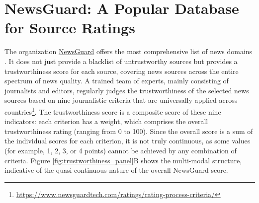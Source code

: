 \documentclass{article}
\begin{document}
\section{NewsGuard: A Popular Database for Source Ratings}
The organization \href{https://www.newsguardtech.com/}{NewsGuard} offers the most comprehensive list of news domains \citep{linHighLevelCorrespondence2023a}. 
It does not just provide a blacklist of untrustworthy sources but provides a trustworthiness score for each source, covering news sources across the entire spectrum of news quality. 
A trained team of experts, mainly consisting of journalists and editors, regularly judges the trustworthiness of the selected news sources based on nine journalistic criteria that are universally applied across countries\footnote{\href{https://web.archive.org/web/20240131155450/https://www.newsguardtech.com/ratings/rating-process-criteria/}{https://www.newsguardtech.com/ratings/rating-process-criteria/}}.
The trustworthiness score is a composite score of these nine indicators: each criterion has a weight, which comprises the overall trustworthiness rating (ranging from 0 to 100). 
Since the overall score is a sum of the individual scores for each criterion, it is not truly continuous, as some values (for example, 1, 2, 3, or 4 points) cannot be achieved by any combination of criteria.
Figure \ref{fig:trustworthiness_panel}B shows the multi-modal structure, indicative of the quasi-continuous nature of the overall NewsGuard score.
\end{document}
